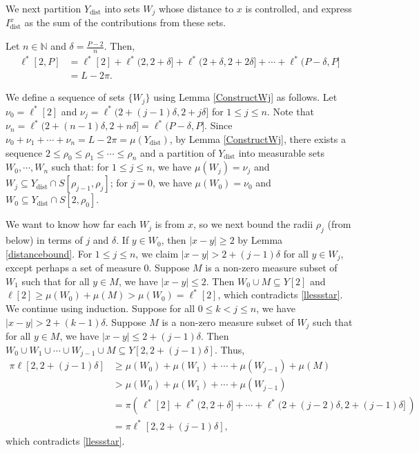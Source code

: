 \documentclass{elsart}
\begin{document}
\begin{pf}
We next partition $Y_{\text{dist}}$ into sets $W_j$ whose distance
to $x$ is controlled, and express $I^x_{\text{dist}}$ as the sum
of the contributions from these sets.

Let $n\in\mathbb{N}$ and $\delta=\frac{P-2}{n}$.  Then,
\begin{align*}
\ell^*[2,P]&=\ell^*[2] + \ell^*(2,2+\delta] + 
\ell^*(2+\delta,2+2\delta] + \cdots + 
\ell^*(P-\delta,P]\\
&=L-2\pi.
\end{align*}

We define a sequence of sets $\{W_j\}$ using Lemma \ref{ConstructWj}
as follows.
Let 
$\nu_0=\ell^*[2]$ and 
$\nu_j=\ell^*(2+(j-1)\delta,2+j\delta]$ for $1\leq j\leq n$.  Note
that $\nu_n=\ell^*(2+(n-1)\delta,2+n\delta]=\ell^*(P-\delta,P]$.
Since $\nu_0+\nu_1+\cdots+\nu_n=L-2\pi=\mu(Y_{\mathrm{dist}})$,
by Lemma \ref{ConstructWj}, there exists a sequence
$2\leq\rho_0\leq\rho_1\leq\cdots\leq\rho_n$ and a partition
of $Y_\mathrm{dist}$ into measurable sets $W_0,\cdots,W_n$ such that:
for $1\leq j\leq n$, we have
$\mu(W_j)=\nu_j$ and $W_j\subseteq Y_\mathrm{dist}\cap S[\rho_{j-1},\rho_j]$;
for $j=0$, we have $\mu(W_0)=\nu_0$ and 
$W_0\subseteq Y_\mathrm{dist}\cap S[2,\rho_0]$.

We want to know how far each $W_j$ is from $x$, so we next bound the radii
$\rho_j$ (from below) in terms of $j$ and $\delta$.
If $y\in W_0$, then $|x-y|\geq 2$ by Lemma \ref{distancebound}.
For $1\leq j\leq n$, we claim $|x-y|>2+(j-1)\delta$ for all
$y\in W_j$, except perhaps a set of measure $0$.
Suppose $M$ is a non-zero measure subset of $W_1$ such that for all
$y\in M$, we have $|x-y|\leq 2$. Then 
$W_0\cup M\subseteq Y[2]$ and 
$\ell[2]\geq \mu(W_0)+\mu(M)> \mu(W_0)=\ell^*[2]$, which 
contradicts \eqref{llessstar}.  We continue using induction.  
Suppose for all
$0\leq k< j\leq n$, we have $|x-y|> 2+(k-1)\delta$.  Suppose
$M$ is a non-zero measure subset of $W_j$ such that for all 
$y\in M$, we have $|x-y|\leq 2+(j-1)\delta$.  Then
$W_0\cup W_1\cup \cdots \cup W_{j-1} \cup M\subseteq Y[2,2+(j-1)\delta]$.
Thus,
\begin{align*}
\pi \ell[2,2+(j-1)\delta] &\geq 
\mu(W_0)+\mu(W_1)+\cdots +\mu(W_{j-1})+\mu(M)\\
&> \mu(W_0)+\mu(W_1)+\cdots +\mu(W_{j-1})\\
&= \pi\left(\,
\ell^*[2]+\ell^*(2,2+\delta]+\cdots+\ell^*(2+(j-2)\delta,2+(j-1)\delta]
\,\right)\\
&= \pi\ell^*[2,2+(j-1)\delta],
\end{align*}
which contradicts \eqref{llessstar}.


\end{pf}
\end{document}

